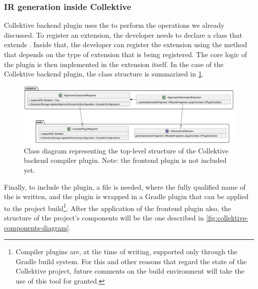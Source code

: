 \documentclass[12pt,a4paper,openright,twoside]{book}
\begin{document}
\subsubsection{IR generation inside Collektive} \label{sec:ir-generation-collektive}

Collektive backend plugin uses the  to perform 
the operations we already discussed. To register an extension, the developer needs
to declare a class that extends . Inside that,
the developer can register the extension using the 
method that depends on the type of extension that is being registered. 
%
The core logic of the plugin is then implemented in the extension itself. In the
case of the Collektive backend plugin, the class structure is summarized 
in \cref{fig:extensions-class-diagram}.

\begin{figure}
  \centering
  \includegraphics[width=.9\linewidth]{figures/extensions-class-diagram.pdf}
  \caption{Class diagram representing the top-level structure of the Collektive 
  backend compiler plugin. Note: the frontend plugin is not included yet.}
  \label{fig:extensions-class-diagram}
\end{figure}

Finally, to include the plugin, a  file is needed, where
the fully qualified name of the  is written,
and the plugin is wrapped in a Gradle plugin that can be applied to the project
build\footnote{Compiler plugins are, at the time of writing, supported only
through the Gradle build system. For this and other reasons that regard the
state of the Collektive project, future comments on the build environment will
take the use of this tool for granted.}. After the application of the frontend
plugin also, the structure of the project's components will be the one described
in \cref{fig:collektive-components-diagram}.
\end{document}
